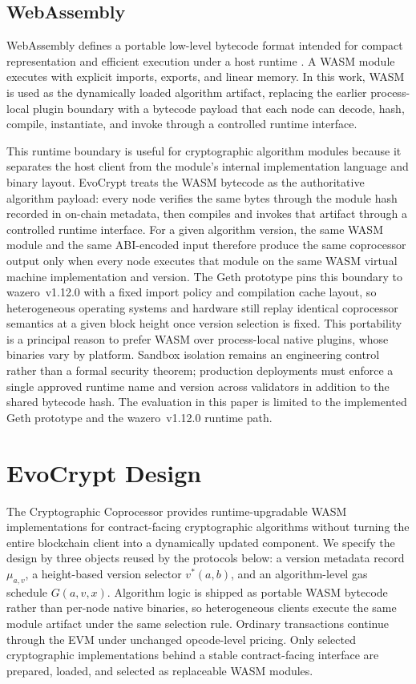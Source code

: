 \documentclass[pdflatex,sn-mathphys-num]{sn-jnl}%
\theoremstyle{thmstyleone}%
\theoremstyle{thmstyletwo}%
\theoremstyle{thmstylethree}%
\begin{document}
\subsection{WebAssembly}\label{sec2.3}
WebAssembly defines a portable low-level bytecode format intended for compact representation and efficient execution under a host runtime \cite{webassemblyCoreSpec}. A WASM module executes with explicit imports, exports, and linear memory. In this work, WASM is used as the dynamically loaded algorithm artifact, replacing the earlier process-local plugin boundary with a bytecode payload that each node can decode, hash, compile, instantiate, and invoke through a controlled runtime interface.

This runtime boundary is useful for cryptographic algorithm modules because it separates the host client from the module's internal implementation language and binary layout. EvoCrypt treats the WASM bytecode as the authoritative algorithm payload: every node verifies the same bytes through the module hash recorded in on-chain metadata, then compiles and invokes that artifact through a controlled runtime interface. For a given algorithm version, the same WASM module and the same ABI-encoded input therefore produce the same coprocessor output only when every node executes that module on the same WASM virtual machine implementation and version. The Geth prototype pins this boundary to wazero~v1.12.0 with a fixed import policy and compilation cache layout, so heterogeneous operating systems and hardware still replay identical coprocessor semantics at a given block height once version selection is fixed. This portability is a principal reason to prefer WASM over process-local native plugins, whose binaries vary by platform. Sandbox isolation remains an engineering control rather than a formal security theorem; production deployments must enforce a single approved runtime name and version across validators in addition to the shared bytecode hash. The evaluation in this paper is limited to the implemented Geth prototype and the wazero~v1.12.0 runtime path.

\section{EvoCrypt Design}\label{sec3}

The Cryptographic Coprocessor provides runtime-upgradable WASM implementations for contract-facing cryptographic algorithms without turning the entire blockchain client into a dynamically updated component. We specify the design by three objects reused by the protocols below: a version metadata record $\mu_{a,v}$, a height-based version selector $v^{*}(a,b)$, and an algorithm-level gas schedule $G(a,v,x)$. Algorithm logic is shipped as portable WASM bytecode rather than per-node native binaries, so heterogeneous clients execute the same module artifact under the same selection rule. Ordinary transactions continue through the EVM under unchanged opcode-level pricing. Only selected cryptographic implementations behind a stable contract-facing interface are prepared, loaded, and selected as replaceable WASM modules.
\end{document}

